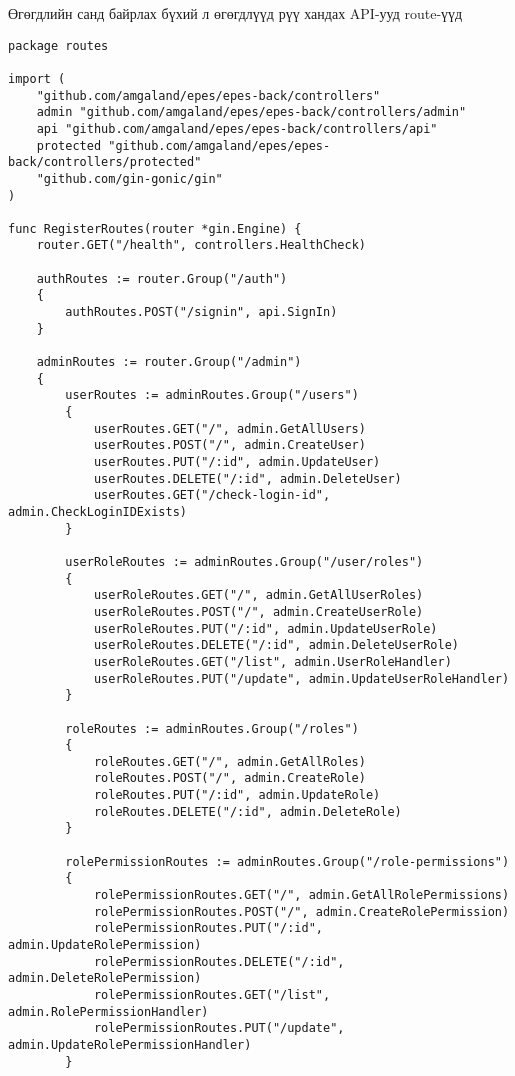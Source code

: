 \par Өгөгдлийн санд байрлах бүхий л өгөгдлүүд рүү хандах API-ууд route-үүд
\begin{lstlisting}[language=Golang, caption=Routes, frame=single]
package routes

import (
	"github.com/amgaland/epes/epes-back/controllers"
	admin "github.com/amgaland/epes/epes-back/controllers/admin"
	api "github.com/amgaland/epes/epes-back/controllers/api"
	protected "github.com/amgaland/epes/epes-back/controllers/protected"
	"github.com/gin-gonic/gin"
)

func RegisterRoutes(router *gin.Engine) {
    router.GET("/health", controllers.HealthCheck)

    authRoutes := router.Group("/auth")
    {
        authRoutes.POST("/signin", api.SignIn)
    }

    adminRoutes := router.Group("/admin")
    {
        userRoutes := adminRoutes.Group("/users")
        {
            userRoutes.GET("/", admin.GetAllUsers)
            userRoutes.POST("/", admin.CreateUser)
            userRoutes.PUT("/:id", admin.UpdateUser)
            userRoutes.DELETE("/:id", admin.DeleteUser)
            userRoutes.GET("/check-login-id", admin.CheckLoginIDExists)
        }

        userRoleRoutes := adminRoutes.Group("/user/roles")
        {
            userRoleRoutes.GET("/", admin.GetAllUserRoles)
            userRoleRoutes.POST("/", admin.CreateUserRole)
            userRoleRoutes.PUT("/:id", admin.UpdateUserRole)
            userRoleRoutes.DELETE("/:id", admin.DeleteUserRole)
            userRoleRoutes.GET("/list", admin.UserRoleHandler)
            userRoleRoutes.PUT("/update", admin.UpdateUserRoleHandler)
        }

        roleRoutes := adminRoutes.Group("/roles")
        {
            roleRoutes.GET("/", admin.GetAllRoles)
            roleRoutes.POST("/", admin.CreateRole)
            roleRoutes.PUT("/:id", admin.UpdateRole)
            roleRoutes.DELETE("/:id", admin.DeleteRole)
        }

        rolePermissionRoutes := adminRoutes.Group("/role-permissions")
        {
            rolePermissionRoutes.GET("/", admin.GetAllRolePermissions)
            rolePermissionRoutes.POST("/", admin.CreateRolePermission)
            rolePermissionRoutes.PUT("/:id", admin.UpdateRolePermission)
            rolePermissionRoutes.DELETE("/:id", admin.DeleteRolePermission)
            rolePermissionRoutes.GET("/list", admin.RolePermissionHandler)
            rolePermissionRoutes.PUT("/update", admin.UpdateRolePermissionHandler)
        }


\end{lstlisting}

